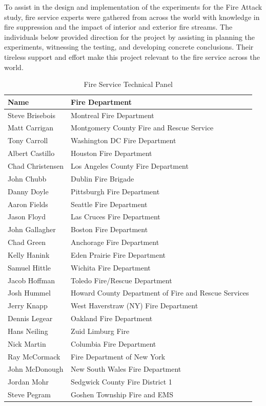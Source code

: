 \documentclass[12pt,oneside]{book}
\begin{document}
\clearpage

To assist in the design and implementation of the experiments for the Fire Attack study, fire service experts were gathered from across the world with knowledge in fire suppression and the impact of interior and exterior fire streams. The individuals below provided direction for the project by assisting in planning the experiments, witnessing the testing, and developing concrete conclusions. Their tireless support and effort make this project relevant to the fire service across the world. 


\begin{table}[!ht]
	\centering
	\caption*{Fire Service Technical Panel}
	\begin{tabular}{ll}
		\toprule[1.5pt]
		Name & Fire Department \\ 
		\midrule
		Steve Brisebois  & Montreal Fire Department \\ 
		Matt Carrigan    & Montgomery County Fire and Rescue Service \\ 
		Tony Carroll     & Washington DC Fire Department \\ 
		Albert Castillo  & Houston Fire Department \\ 
		Chad Christensen & Los Angeles County Fire Department \\ 
		John Chubb       & Dublin Fire Brigade \\ 		 		  
		Danny Doyle      & Pittsburgh Fire Department \\ 
		Aaron Fields     & Seattle Fire Department \\ 
		Jason Floyd      & Las Cruces Fire Department \\ 
		John Gallagher   & Boston Fire Department \\ 
		Chad Green       & Anchorage Fire Department \\ 
		Kelly Hanink     & Eden Prairie Fire Department \\ 
		Samuel Hittle    & Wichita Fire Department \\ 
		Jacob Hoffman    & Toledo Fire/Rescue Department \\ 
		Josh Hummel      & Howard County Department of Fire and Rescue Services \\ 
		Jerry Knapp      & West Haverstraw (NY) Fire Department \\ 
		Dennis Legear    & Oakland Fire Department \\ 
		Hans Neiling     & Zuid Limburg Fire \\ 
		Nick Martin      & Columbia Fire Department \\ 
		Ray McCormack    & Fire Department of New York \\ 
		John McDonough   & New South Wales Fire Department \\ 
		Jordan Mohr      & Sedgwick County Fire District 1 \\ 
		Steve Pegram     & Goshen Township Fire and EMS \\ 
		\bottomrule[1.25pt]
	\end{tabular}
\end{table}
\end{document}
